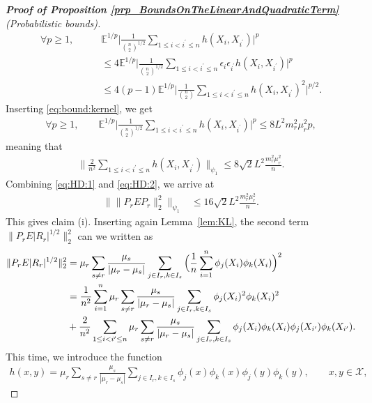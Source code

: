 \documentclass[a4paper,11pt]{article} %
\numberwithin{equation}{section}
\theoremstyle{definition}
\theoremstyle{remark}
\theoremstyle{plain}
\begin{document}
\begin{proof}[\normalfont \textbf{Proof of Proposition \ref{prp_BoundsOnTheLinearAndQuadraticTerm}} (Probabilistic bounds)]
\begin{align}
        \forall p\geq 1,\qquad&\mathbb{E}^{1/p}\Big|\frac{1}{\binom{n}{2}^{1/2}}\sum_{1\leq i<i^\prime\leq n}h(X_{i},X_{i^\prime})\Big|^p\\
        &\leq 4\mathbb{E}^{1/p}\Big|\frac{1}{\binom{n}{2}^{1/2}}\sum_{1\leq i<i^\prime\leq n}\epsilon_{i}\epsilon_{i^\prime}h(X_{i},X_{i^\prime})\Big|^p\\
        &\leq 4(p-1)\mathbb{E}^{1/p}\Big|\frac{1}{\binom{n}{2}}\sum_{1\leq i<i^\prime\leq n}h(X_{i},X_{i^\prime})^2\Big|^{p/2}.
    \end{align}
    Inserting \eqref{eq:bound:kernel}, we get
    \begin{align}
       \forall p\geq 1,\qquad\mathbb{E}^{1/p}\Big|\frac{1}{\binom{n}{2}^{1/2}}\sum_{1\leq i<i^\prime\leq n}h(X_{i},X_{i^\prime})\Big|^p\leq 8L^2m_r^2\mu_r^2p,
    \end{align}
    meaning that
    \begin{align}\label{eq:HD:2}
       \Big\|\frac{2}{n^2}\sum_{1\leq i<i^\prime\leq n}h(X_{i},X_{i^\prime})\Big\|_{\psi_1}\leq 8\sqrt{2}L^2\frac{m_r^2\mu_r^2}{n}.
    \end{align}
    Combining \eqref{eq:HD:1} and \eqref{eq:HD:2}, we arrive at
    \begin{align}
        \big\|\| P_{r} E P_{r} \|_{2}^2\big\|_{\psi_1}&\leq  16\sqrt{2}L^2\frac{m_r^2\mu_r^2}{n}.
    \end{align}
    This gives claim (i). Inserting again Lemma~\ref{lem:KL}, the second term \( \| P_{r} E | R_{r} |^{1/2} \|_{2}^2 \) can we written as
    \begin{align}
        \| P_{r} E | R_{r} |^{1/2} \|_{2}^2
    &= 
        \mu_{r}\sum_{s\neq r}\frac{\mu_s}{|\mu_r-\mu_s|} \sum_{ j\in I_{r}, k \in I_{s}  } 
                    \Big( \frac{1}{n} \sum_{ i = 1 }^{n} 
                          \phi_j(X_i) \phi_k(X_i)
                    \Big)^{2}\\
    &= \frac{1}{n^2}\sum_{i=1}^n \mu_{r}\sum_{s\neq r}\frac{\mu_s}{|\mu_r-\mu_s|} \sum_{ j\in I_{r}, k \in I_{s}  } \phi_j(X_i)^2 \phi_k(X_i)^2
    \notag
    \\
    &+\frac{2}{n^2}\sum_{1\leq i<i^\prime\leq n} \mu_{r}\sum_{s\neq r}\frac{\mu_s}{|\mu_r-\mu_s|} \sum_{ j\in I_{r}, k \in I_{s} }\phi_j(X_i) \phi_k(X_i)\phi_j(X_{i^\prime}) \phi_k(X_{i^\prime}).
    \notag 
  \end{align}
  This time, we introduce the function
  \begin{align}
      h(x,y)=\mu_{r}\sum_{s\neq r}\frac{\mu_s}{|\mu_r-\mu_s|} \sum_{ j\in I_{r}, k \in I_{s}  } \phi_j(x)\phi_k(x) \phi_j(y) \phi_k(y),\qquad x,y\in\mathcal{X},

\end{align}
\end{proof}
\end{document}
